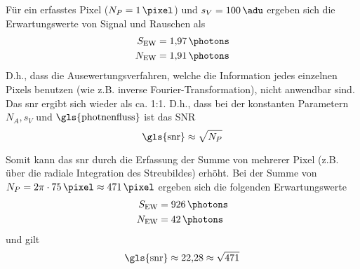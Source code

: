 \noindent
Für ein erfasstes Pixel ($N_P = \SI{1}{\pixel}$) und $s_V = \SI{100}{\adu}$ ergeben sich die Erwartungswerte von Signal und Rauschen als
\begin{equation}
    \begin{split}
        S_\text{EW} &= \SI{1.97}{\photons}\\
        N_\text{EW} &= \SI{1.91}{\photons}\\
    \end{split}
\end{equation}
\noindent
D.h., dass die Ausewertungsverfahren, welche die Information jedes einzelnen Pixels benutzen (wie z.B. inverse Fourier-Transformation), nicht anwendbar sind. Das \gls{snr} ergibt sich wieder als ca. 1:1. D.h., dass bei der konstanten Parametern $N_A, s_V$ und $\text{\gls{photnenfluss}}$ ist das SNR
\begin{equation}
    \text{\gls{snr}} \approx \sqrt{N_P}
\end{equation}

\noindent
Somit kann das \gls{snr} durch die Erfassung der Summe von mehrerer Pixel (z.B. über die radiale Integration des Streubildes) erhöht. Bei der Summe von $N_P = 2\pi\cdot\SI{75}{\pixel} \approx \SI{471}{\pixel}$ ergeben sich die folgenden Erwartungswerte
\begin{equation}
    \begin{split}
        S_\text{EW} &= \SI{926}{\photons}\\
        N_\text{EW} &= \SI{42}{\photons}\\
    \end{split}
\end{equation}
und gilt
\begin{equation}
    \text{\gls{snr}} \approx \num{22.28} \approx \sqrt{471}
\end{equation}



